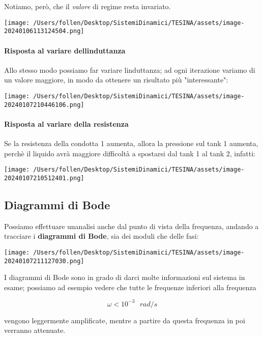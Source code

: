 \documentclass[
]{article}
\begin{document}
Notiamo, però, che il \emph{valore} di regime resta invariato.

\texttt{[image: /Users/follen/Desktop/SistemiDinamici/TESINA/assets/image-20240106113124504.png]}

\hypertarget{risposta-al-variare-dellinduttanza}{%
\paragraph{Risposta al variare
dell\textquotesingle induttanza}\label{risposta-al-variare-dellinduttanza}}

Allo stesso modo possiamo far variare l\textquotesingle induttanza; ad
ogni iterazione variamo di un valore maggiore, in modo da ottenere un
risultato più "interessante":

\texttt{[image: /Users/follen/Desktop/SistemiDinamici/TESINA/assets/image-20240107210446106.png]}

\hypertarget{risposta-al-variare-della-resistenza}{%
\paragraph{Risposta al variare della
resistenza}\label{risposta-al-variare-della-resistenza}}

Se la resistenza della condotta 1 aumenta, allora la pressione sul tank
1 aumenta, perchè il liquido avrà maggiore difficoltà a spostarsi dal
tank 1 al tank 2, infatti:

\texttt{[image: /Users/follen/Desktop/SistemiDinamici/TESINA/assets/image-20240107210512401.png]}

\hypertarget{diagrammi-di-bode}{%
\subsection{Diagrammi di Bode}\label{diagrammi-di-bode}}

Possiamo effettuare un\textquotesingle analisi anche dal punto di vista
della frequenza, andando a tracciare i \textbf{diagrammi di Bode}, sia
dei moduli che delle fasi:

\texttt{[image: /Users/follen/Desktop/SistemiDinamici/TESINA/assets/image-20240107211127030.png]}

I diagrammi di Bode sono in grado di darci molte informazioni sul
sistema in esame; possiamo ad esempio vedere che tutte le frequenze
inferiori alla frequenza

\[\omega < 10^{-3} \ \ \ rad/s\]

vengono leggermente amplificate, mentre a partire da questa frequenza in
poi verranno attenuate.
\end{document}

